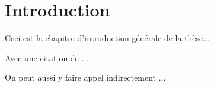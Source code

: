 \chapter*{Introduction}

Ceci est la chapitre d'introduction générale de la thèse...

Avec une citation de \textcite{hawking1988}...

On peut aussi y faire appel indirectement \parencite{hawking1988}...

